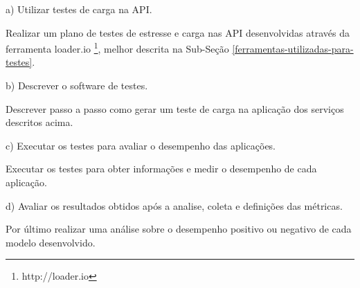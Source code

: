   \begin{compactitem}
    \item[a)] Utilizar testes de carga na \ac{API}.
    
    Realizar um plano de testes de estresse e carga nas \ac{API} desenvolvidas através
    da ferramenta loader.io \footnote{\label{loader.io}http://loader.io}, melhor descrita na Sub-Seção \ref{ferramentas-utilizadas-para-testes}.
    
    
    \item[b)] Descrever o software de testes.
    
    Descrever passo a passo como gerar um teste de carga na aplicação dos serviços descritos acima.
    
    \item[c)] Executar os testes para avaliar o desempenho das aplicações.
    
    Executar os testes para obter informações e medir o desempenho de cada aplicação.
    
    \item[d)] Avaliar os resultados obtidos após a analise, coleta e definições das métricas.
    
    Por último realizar uma análise sobre o desempenho positivo ou negativo de cada modelo desenvolvido.
    
    
  \end{compactitem}




